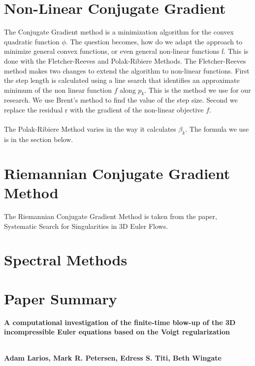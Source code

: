 \documentclass[12pt]{article}
\begin{document}
\begin{flushleft}
\section{Non-Linear Conjugate Gradient}

\qquad The Conjugate Gradient method is a minimization algorithm for the convex quadratic function $\phi$. The question becomes, how do we adapt the approach to minimize general convex functions, or even general non-linear functions f. This is done with the Fletcher-Reeves and Polak-Ribiere Methods. The Fletcher-Reeves method makes two changes to extend the algorithm to non-linear functions. First the step length is calculated using a line search that identifies an approximate minimum of the non linear function $f$ along $p_k$. This is the method we use for our research. We use Brent's method to find the value of the step size. Second we replace the residual r with the gradient of the non-linear objective $f$.
\\~\\
The Polak-Ribiere Method varies in the way it calculates $\beta_k$. The formula we use is in the section below.

\section{Riemannian Conjugate Gradient Method}

\qquad The Riemannian Conjugate Gradient Method is taken from the paper, Systematic Search for Singularities in 3D Euler Flows. 

\section{Spectral Methods}

\pagebreak

\section{Paper Summary}
\begin{center}
\begin{large}
\textbf{A computational investigation of the finite-time blow-up of the 3D incompressible Euler equations based on the Voigt regularization}
\\~\\
\end{large}
\textbf{Adam Larios, Mark R. Petersen, Edress S. Titi, Beth Wingate}
\\~\\
\end{center}


\end{flushleft}
\end{document}
